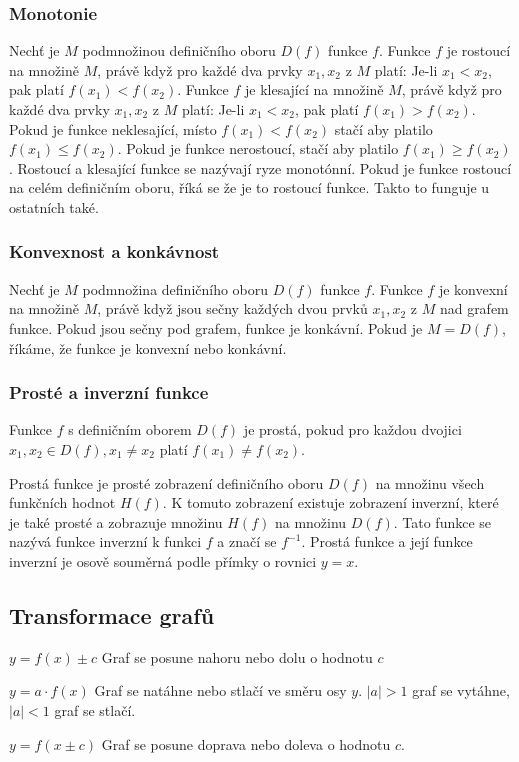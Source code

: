 \documentclass[12pt]{article}
\begin{document}
\subsubsection*{Monotonie}
Nechť je $M$ podmnožinou definičního oboru $D(f)$ funkce $f$. Funkce $f$ je rostoucí na množině $M$,
právě když pro každé dva prvky $x_1, x_2$ z $M$ platí: Je-li $x_1 < x_2$, pak platí $f(x_1) < f(x_2)$.
Funkce $f$ je klesající na množině $M$, právě když pro každé dva prvky $x_1, x_2$ z $M$ platí: Je-li
$x_1 < x_2$, pak platí $f(x_1) > f(x_2)$. Pokud je funkce neklesající, místo $f(x_1) < f(x_2)$ stačí
aby platilo $f(x_1) \le f(x_2)$. Pokud je funkce nerostoucí, stačí aby platilo $f(x_1) \ge f(x_2)$.
Rostoucí a klesající funkce se nazývají ryze monotónní. Pokud je funkce rostoucí na celém definičním
oboru, říká se že je to rostoucí funkce. Takto to funguje u ostatních také.
\subsubsection*{Konvexnost a konkávnost}
Nechť je $M$ podmnožina definičního oboru $D(f)$ funkce $f$. Funkce $f$ je konvexní na množině $M$,
právě když jsou sečny každých dvou prvků $x_1, x_2$ z $M$ nad grafem funkce. Pokud jsou sečny pod
grafem, funkce je konkávní. Pokud je $M = D(f)$, říkáme, že funkce je konvexní nebo konkávní.
\subsubsection*{Prosté a inverzní funkce}
Funkce $f$ s definičním oborem $D(f)$ je prostá, pokud pro každou dvojici $x_1, x_2 \in D(f), x_1 \ne
x_2$ platí $f(x_1) \ne f(x_2)$.

Prostá funkce je prosté zobrazení definičního oboru $D(f)$ na množinu všech
funkčních hodnot $H(f)$. K tomuto zobrazení existuje zobrazení inverzní, které je také prosté a
zobrazuje množinu $H(f)$ na množinu $D(f)$. Tato funkce se nazývá funkce inverzní k funkci $f$ a značí
se $f^{-1}$. Prostá funkce a její funkce inverzní je osově souměrná podle přímky o rovnici $y = x$.
\subsection*{Transformace grafů}
$y = f(x) \pm c$ Graf se posune nahoru nebo dolu o hodnotu $c$

$y = a \cdot f(x)$ Graf se natáhne nebo stlačí ve směru osy $y$. $|a| > 1$ graf se vytáhne, $|a| < 1$
graf se stlačí.

$y = f(x \pm c)$ Graf se posune doprava nebo doleva o hodnotu $c$.
\end{document}
